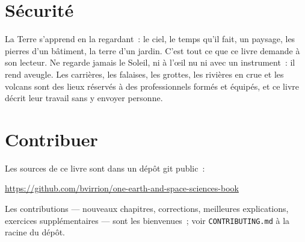 \section*{Sécurité}

La Terre s'apprend en la regardant~: le ciel, le temps qu'il fait, un
paysage, les pierres d'un bâtiment, la terre d'un jardin. C'est tout ce
que ce livre demande à son lecteur. Ne regarde jamais le Soleil, ni à
l'œil nu ni avec un instrument~: il rend aveugle. Les carrières, les
falaises, les grottes, les rivières en crue et les volcans sont des lieux
réservés à des professionnels formés et équipés, et ce livre décrit leur
travail sans y envoyer personne.

\section*{Contribuer}

Les sources de ce livre sont dans un dépôt git public~:
\begin{center}
\url{https://github.com/bvirrion/one-earth-and-space-sciences-book}
\end{center}
Les contributions --- nouveaux chapitres, corrections, meilleures
explications, exercices supplémentaires --- sont les bienvenues~; voir
\texttt{CONTRIBUTING.md} à la racine du dépôt.
